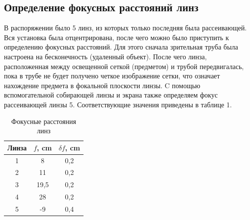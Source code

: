 \documentclass[a4paper, 12pt]{article}
\begin{document}
\subsection{Определение фокусных расстояний линз}
В распоряжении было 5 линз, из которых только последняя была рассеивающей. Вся установка была отцентрирована, после чего можно было приступить к определению фокусных расстояний. Для этого сначала зрительная труба была настроена на бесконечность (удаленный объект). После чего линза, расположенная между освещенной сеткой (предметом) и трубой передвигалась, пока в трубе не будет получено четкое изображение сетки, что означает нахождение предмета в фокальной плоскости линзы. C помощью вспомогательной собирающей линзы и экрана также определяем фокус рассеивающей линзы 5. Соответствующие значения приведены в таблице 1.

\begin{table}[h]
\begin{center}
\caption{Фокусные расстояния линз}
\begin{tabular}{|c|c|c|}
\hline
Линза & $f$, cm & $\delta f$, cm   \\ \hline
1     & 8     & 0,2 \\ \hline
2     & 11    & 0,2 \\ \hline
3     & 19,5  & 0,2 \\ \hline
4     & 28    & 0,2 \\ \hline
5     & -9    & 0,4 \\ \hline
\end{tabular}
\end{center}
\end{table}
\end{document}
